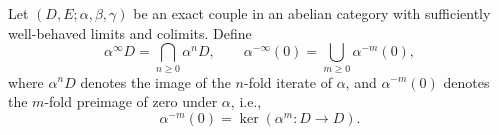 \begin{definition}
Let $(D, E; \alpha, \beta, \gamma)$ be an exact couple in an abelian category with sufficiently well-behaved limits and colimits. Define
\[
\alpha^{\infty} D = \bigcap_{n \geq 0} \alpha^{n} D,
\qquad
\alpha^{-\infty}(0) = \bigcup_{m \geq 0} \alpha^{-m}(0),
\tag{4.24}
\]
where $\alpha^n D$ denotes the image of the $n$-fold iterate of $\alpha$, and $\alpha^{-m}(0)$ denotes the $m$-fold preimage of zero under $\alpha$, i.e.,
\[
\alpha^{-m}(0) = \ker(\alpha^m : D \to D).
\]
\end{definition}
